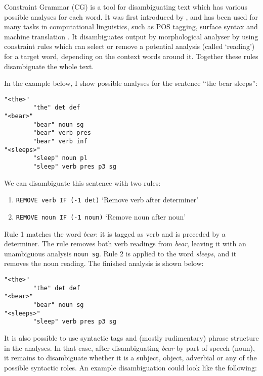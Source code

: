 
Constraint Grammar (CG) is a tool for disambiguating text which has various
possible analyses for each word. It was first introduced by
\cite{karlsson1995constraint}, and has been used for many tasks in
computational linguistics, such as POS tagging, surface syntax and
machine translation \cite{bick2011}. It disambiguates output by
morphological analyser by using
constraint rules which can select or remove a potential analysis
(called `reading') for a
target word, depending on the context words around it. Together these rules disambiguate the whole text.

In the example below, I show possible analyses for the sentence ``the bear
sleeps'':


\begin{verbatim}
"<the>"
        "the" det def
"<bear>"
        "bear" noun sg
        "bear" verb pres
        "bear" verb inf
"<sleeps>"
        "sleep" noun pl
        "sleep" verb pres p3 sg
\end{verbatim}

\noindent We can disambiguate this sentence with two rules:

\begin{enumerate}
\def\labelenumi{\arabic{enumi}.}
\itemsep1pt\parskip0pt
\item \texttt{REMOVE verb IF (-1 det)}
  `Remove verb after determiner'
\item  \texttt{REMOVE noun IF (-1 noun)}
  `Remove noun after noun'
\end{enumerate}

\noindent Rule 1 matches the word \emph{bear}: it is tagged as verb and is
preceded by a determiner. The rule removes both verb readings from
\emph{bear}, leaving it with an unambiguous analysis \texttt{noun sg}.
Rule 2 is applied to the word \emph{sleeps}, and it removes the noun
reading. The finished analysis is shown below:


\begin{verbatim}
"<the>"
        "the" det def
"<bear>"
        "bear" noun sg
"<sleeps>"
        "sleep" verb pres p3 sg
\end{verbatim}

It is also possible to use syntactic tags and (mostly rudimentary) phrase
structure in the analyses. In that
case, after disambiguating \emph{bear} by part of speech (noun), it
remains to disambiguate whether it is a subject, object, adverbial or
any of the possible syntactic roles. An example disambiguation could
look like the following:


